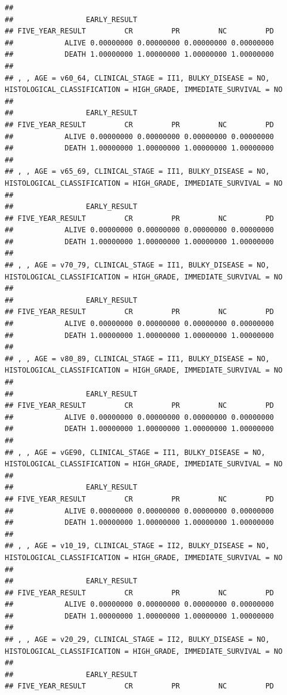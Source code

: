 \documentclass[]{article}
\begin{document}
\begin{verbatim}
## 
##                 EARLY_RESULT
## FIVE_YEAR_RESULT         CR         PR         NC         PD
##            ALIVE 0.00000000 0.00000000 0.00000000 0.00000000
##            DEATH 1.00000000 1.00000000 1.00000000 1.00000000
## 
## , , AGE = v60_64, CLINICAL_STAGE = II1, BULKY_DISEASE = NO, HISTOLOGICAL_CLASSIFICATION = HIGH_GRADE, IMMEDIATE_SURVIVAL = NO
## 
##                 EARLY_RESULT
## FIVE_YEAR_RESULT         CR         PR         NC         PD
##            ALIVE 0.00000000 0.00000000 0.00000000 0.00000000
##            DEATH 1.00000000 1.00000000 1.00000000 1.00000000
## 
## , , AGE = v65_69, CLINICAL_STAGE = II1, BULKY_DISEASE = NO, HISTOLOGICAL_CLASSIFICATION = HIGH_GRADE, IMMEDIATE_SURVIVAL = NO
## 
##                 EARLY_RESULT
## FIVE_YEAR_RESULT         CR         PR         NC         PD
##            ALIVE 0.00000000 0.00000000 0.00000000 0.00000000
##            DEATH 1.00000000 1.00000000 1.00000000 1.00000000
## 
## , , AGE = v70_79, CLINICAL_STAGE = II1, BULKY_DISEASE = NO, HISTOLOGICAL_CLASSIFICATION = HIGH_GRADE, IMMEDIATE_SURVIVAL = NO
## 
##                 EARLY_RESULT
## FIVE_YEAR_RESULT         CR         PR         NC         PD
##            ALIVE 0.00000000 0.00000000 0.00000000 0.00000000
##            DEATH 1.00000000 1.00000000 1.00000000 1.00000000
## 
## , , AGE = v80_89, CLINICAL_STAGE = II1, BULKY_DISEASE = NO, HISTOLOGICAL_CLASSIFICATION = HIGH_GRADE, IMMEDIATE_SURVIVAL = NO
## 
##                 EARLY_RESULT
## FIVE_YEAR_RESULT         CR         PR         NC         PD
##            ALIVE 0.00000000 0.00000000 0.00000000 0.00000000
##            DEATH 1.00000000 1.00000000 1.00000000 1.00000000
## 
## , , AGE = vGE90, CLINICAL_STAGE = II1, BULKY_DISEASE = NO, HISTOLOGICAL_CLASSIFICATION = HIGH_GRADE, IMMEDIATE_SURVIVAL = NO
## 
##                 EARLY_RESULT
## FIVE_YEAR_RESULT         CR         PR         NC         PD
##            ALIVE 0.00000000 0.00000000 0.00000000 0.00000000
##            DEATH 1.00000000 1.00000000 1.00000000 1.00000000
## 
## , , AGE = v10_19, CLINICAL_STAGE = II2, BULKY_DISEASE = NO, HISTOLOGICAL_CLASSIFICATION = HIGH_GRADE, IMMEDIATE_SURVIVAL = NO
## 
##                 EARLY_RESULT
## FIVE_YEAR_RESULT         CR         PR         NC         PD
##            ALIVE 0.00000000 0.00000000 0.00000000 0.00000000
##            DEATH 1.00000000 1.00000000 1.00000000 1.00000000
## 
## , , AGE = v20_29, CLINICAL_STAGE = II2, BULKY_DISEASE = NO, HISTOLOGICAL_CLASSIFICATION = HIGH_GRADE, IMMEDIATE_SURVIVAL = NO
## 
##                 EARLY_RESULT
## FIVE_YEAR_RESULT         CR         PR         NC         PD

\end{verbatim}
\end{document}
